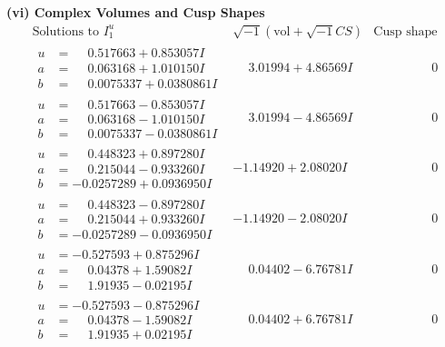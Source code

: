 \documentclass[1p]{elsarticle_modified}
\theoremstyle{definition}
\newcommand{\I}{\sqrt{-1}}
\begin{document}
\newpage\flushleft \textbf{(vi) Complex Volumes and Cusp Shapes}
$$\begin{array}{c|c|c}  
\text{Solutions to }I^u_{1}& \I (\text{vol} + \sqrt{-1}CS) & \text{Cusp shape}\\
 \hline 
\begin{aligned}
u &= \phantom{-}0.517663 + 0.853057 I \\
a &= \phantom{-}0.063168 + 1.010150 I \\
b &= \phantom{-}0.0075337 + 0.0380861 I\end{aligned}
 & \phantom{-}3.01994 + 4.86569 I & \phantom{-0.000000 } 0 \\ \hline\begin{aligned}
u &= \phantom{-}0.517663 - 0.853057 I \\
a &= \phantom{-}0.063168 - 1.010150 I \\
b &= \phantom{-}0.0075337 - 0.0380861 I\end{aligned}
 & \phantom{-}3.01994 - 4.86569 I & \phantom{-0.000000 } 0 \\ \hline\begin{aligned}
u &= \phantom{-}0.448323 + 0.897280 I \\
a &= \phantom{-}0.215044 - 0.933260 I \\
b &= -0.0257289 + 0.0936950 I\end{aligned}
 & -1.14920 + 2.08020 I & \phantom{-0.000000 } 0 \\ \hline\begin{aligned}
u &= \phantom{-}0.448323 - 0.897280 I \\
a &= \phantom{-}0.215044 + 0.933260 I \\
b &= -0.0257289 - 0.0936950 I\end{aligned}
 & -1.14920 - 2.08020 I & \phantom{-0.000000 } 0 \\ \hline\begin{aligned}
u &= -0.527593 + 0.875296 I \\
a &= \phantom{-}0.04378 + 1.59082 I \\
b &= \phantom{-}1.91935 - 0.02195 I\end{aligned}
 & \phantom{-}0.04402 - 6.76781 I & \phantom{-0.000000 } 0 \\ \hline\begin{aligned}
u &= -0.527593 - 0.875296 I \\
a &= \phantom{-}0.04378 - 1.59082 I \\
b &= \phantom{-}1.91935 + 0.02195 I\end{aligned}
 & \phantom{-}0.04402 + 6.76781 I & \phantom{-0.000000 } 0 \\ \hline\begin{aligned}

\end{aligned}
\end{array}$$
\end{document}
